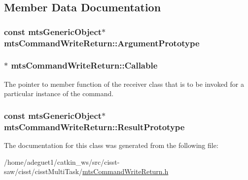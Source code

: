 \subsection{Member Data Documentation}
\hypertarget{classmts_command_write_return_a21b712fb9036e3dfad2d67c5f15932d2}{
\subsubsection[{Argument\-Prototype}]{\setlength{\rightskip}{0pt plus 5cm}const {\bf mts\-Generic\-Object}$\ast$ mts\-Command\-Write\-Return\-::\-Argument\-Prototype\hspace{0.3cm}{\ttfamily [protected]}}}\label{classmts_command_write_return_a21b712fb9036e3dfad2d67c5f15932d2}
\hypertarget{classmts_command_write_return_ada842b5e68290a2c53de66702025f4ab}{
\subsubsection[{Callable}]{$\ast$ mts\-Command\-Write\-Return\-::\-Callable\hspace{0.3cm}{\ttfamily [protected]}}}\label{classmts_command_write_return_ada842b5e68290a2c53de66702025f4ab}
The pointer to member function of the receiver class that is to be invoked for a particular instance of the command. \hypertarget{classmts_command_write_return_a02ec49cd66e7d95bd1ac9d08e5eb8cae}{
\subsubsection[{Result\-Prototype}]{\setlength{\rightskip}{0pt plus 5cm}const {\bf mts\-Generic\-Object}$\ast$ mts\-Command\-Write\-Return\-::\-Result\-Prototype\hspace{0.3cm}{\ttfamily [protected]}}}\label{classmts_command_write_return_a02ec49cd66e7d95bd1ac9d08e5eb8cae}


The documentation for this class was generated from the following file\-:\begin{DoxyCompactItemize}
\item 
/home/adeguet1/catkin\-\_\-ws/src/cisst-\/saw/cisst/cisst\-Multi\-Task/\hyperlink{mts_command_write_return_8h}{mts\-Command\-Write\-Return.\-h}\end{DoxyCompactItemize}
